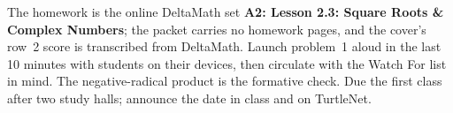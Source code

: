 \documentclass[10pt]{article}
\begin{document}
\begin{teachernote}[Homework]
The homework is the online DeltaMath set \textbf{A2: Lesson 2.3: Square Roots \& Complex Numbers}; the
packet carries no homework pages, and the cover's row~2 score is transcribed from DeltaMath.
Launch problem~1 aloud in the last 10 minutes with students on their devices, then circulate
with the Watch For list in mind. The negative-radical product is the formative check. Due the
first class after two study halls; announce the date in class and on TurtleNet.
\end{teachernote}
\end{document}
